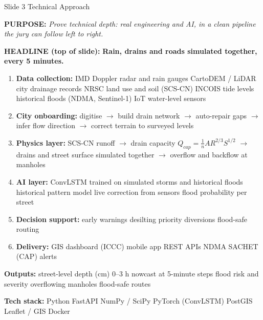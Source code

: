 \documentclass[11pt,a4paper]{article}
\newcommand{\purpose}[1]{\par{\small\color{ink!70}\textbf{PURPOSE:} \emph{#1}}\par\medskip}
\newcommand{\hookline}[1]{%
  \begin{tcolorbox}[colback=hook!6,colframe=hook,boxrule=0.6pt,arc=2pt,left=7pt,right=7pt,top=4pt,bottom=4pt]
  {\color{hook}\textbf{HEADLINE (top of slide):}} \textbf{#1}\end{tcolorbox}}
\newcommand{\slidepart}[2]{\par\smallskip{\color{#1}\textbf{#2}}\par\smallskip}
\newcommand{\onslide}{\slidepart{accent}{ON THE SLIDE}}
\begin{document}
\begin{slidebox}{Slide 3 \textendash{} Technical Approach}
\purpose{Prove technical depth: real engineering and AI, in a clean pipeline the jury can
follow left to right.}
\hookline{Rain, drains and roads \textendash{} simulated together, every 5 minutes.}

\onslide
\begin{enumerate}[label=\textbf{\arabic*.}]
  \item \textbf{Data collection:} IMD Doppler radar and rain gauges \textperiodcentered{}
        CartoDEM / LiDAR \textperiodcentered{} city drainage records \textperiodcentered{}
        NRSC land use and soil (SCS-CN) \textperiodcentered{} INCOIS tide levels
        \textperiodcentered{} historical floods (NDMA, Sentinel-1) \textperiodcentered{}
        IoT water-level sensors
  \item \textbf{City onboarding:} digitise $\rightarrow$ build drain network $\rightarrow$
        auto-repair gaps $\rightarrow$ infer flow direction $\rightarrow$ correct terrain
        to surveyed levels
  \item \textbf{Physics layer:} SCS-CN runoff $\rightarrow$ drain capacity
        $Q_{cap} = \frac{1}{n} A R^{2/3} S^{1/2}$ $\rightarrow$ drains and street surface
        simulated together $\rightarrow$ overflow and backflow at manholes
  \item \textbf{AI layer:} ConvLSTM trained on simulated storms and historical floods
        \textperiodcentered{} historical pattern model \textperiodcentered{} live correction
        from sensors \textperiodcentered{} flood probability per street
  \item \textbf{Decision support:} early warnings \textperiodcentered{} desilting priority
        \textperiodcentered{} diversions \textperiodcentered{} flood-safe routing
  \item \textbf{Delivery:} GIS dashboard (ICCC) \textperiodcentered{} mobile app
        \textperiodcentered{} REST APIs \textperiodcentered{} NDMA SACHET (CAP) alerts
\end{enumerate}
\textbf{Outputs:} street-level depth (cm) \textperiodcentered{} 0--3 h nowcast at
5-minute steps \textperiodcentered{} flood risk and severity \textperiodcentered{}
overflowing manholes \textperiodcentered{} flood-safe routes

\textbf{Tech stack:} Python \textperiodcentered{} FastAPI \textperiodcentered{}
NumPy / SciPy \textperiodcentered{} PyTorch (ConvLSTM) \textperiodcentered{} PostGIS
\textperiodcentered{} Leaflet / GIS \textperiodcentered{} Docker


\end{slidebox}
\end{document}

